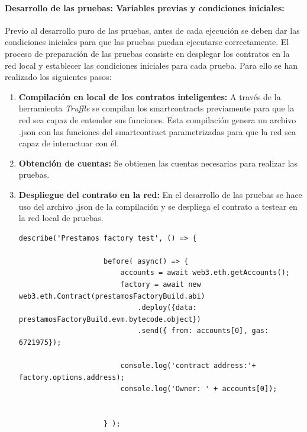 \paragraph{Desarrollo de las pruebas: Variables previas y condiciones iniciales:}
Previo al desarrollo puro de las pruebas, antes de cada ejecución se deben dar las condiciones iniciales para que las pruebas puedan ejecutarse correctamente.
El proceso de preparación de las pruebas consiste en desplegar los contratos en la red local y establecer las condiciones iniciales para cada prueba.
Para ello se han realizado los siguientes pasos:
\begin{enumerate}
    \item \textbf{Compilación en local de los contratos inteligentes:} A través de la
    herramienta \textit{Truffle} se compilan los \glspl{smartcontract} 
    previamente para que la red sea capaz de entender sus funciones.
    Esta compilación genera un archivo .json con las funciones del \gls{smartcontract} 
    parametrizadas para que la red sea capaz de interactuar con él.
    \item \textbf{Obtención de cuentas:} Se obtienen las cuentas necesarias para realizar las pruebas.
    \item \textbf{Despliegue del contrato en la red:} En el desarrollo de las pruebas se hace uso del archivo .json de la compilación y se despliega el contrato a testear en la red local de pruebas.
            \begin{lstlisting}[language=Solidity, caption={Despliegue de contrato en la red local}]
                    describe('Prestamos factory test', () => {

                    before( async() => {  
                        accounts = await web3.eth.getAccounts();
                        factory = await new web3.eth.Contract(prestamosFactoryBuild.abi)
                            .deploy({data: prestamosFactoryBuild.evm.bytecode.object})
                            .send({ from: accounts[0], gas: 6721975});
                        
                        console.log('contract address:'+ factory.options.address);
                        console.log('Owner: ' + accounts[0]);
                        
                        
                    } );

                \end{lstlisting}


\end{enumerate}
